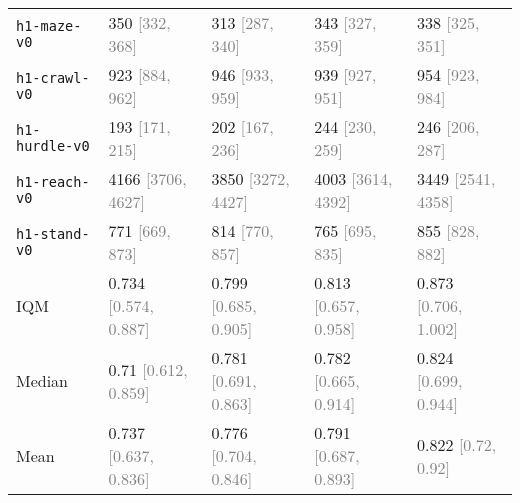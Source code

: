 \begin{table}[h]
{{\begin{tabular}{lllll}
\texttt{h1-maze-v0} & 350 \textcolor{gray}{[332, 368]} & 313 \textcolor{gray}{[287, 340]} & 343 \textcolor{gray}{[327, 359]} & 338 \textcolor{gray}{[325, 351]} \\
\texttt{h1-crawl-v0} & 923 \textcolor{gray}{[884, 962]} & 946 \textcolor{gray}{[933, 959]} & 939 \textcolor{gray}{[927, 951]} & 954 \textcolor{gray}{[923, 984]} \\
\texttt{h1-hurdle-v0} & 193 \textcolor{gray}{[171, 215]} & 202 \textcolor{gray}{[167, 236]} & 244 \textcolor{gray}{[230, 259]} & 246 \textcolor{gray}{[206, 287]} \\
\texttt{h1-reach-v0} & 4166 \textcolor{gray}{[3706, 4627]} & 3850 \textcolor{gray}{[3272, 4427]} & 4003 \textcolor{gray}{[3614, 4392]} & 3449 \textcolor{gray}{[2541, 4358]} \\
\texttt{h1-stand-v0} & 771 \textcolor{gray}{[669, 873]} & 814 \textcolor{gray}{[770, 857]} & 765 \textcolor{gray}{[695, 835]} & 855 \textcolor{gray}{[828, 882]} \\ \midrule
IQM & 0.734 \textcolor{gray}{[0.574, 0.887]} & 0.799 \textcolor{gray}{[0.685, 0.905]} & 0.813 \textcolor{gray}{[0.657, 0.958]} & 0.873 \textcolor{gray}{[0.706, 1.002]} \\
Median & 0.71 \textcolor{gray}{[0.612, 0.859]} & 0.781 \textcolor{gray}{[0.691, 0.863]} & 0.782 \textcolor{gray}{[0.665, 0.914]} & 0.824 \textcolor{gray}{[0.699, 0.944]} \\
Mean & 0.737 \textcolor{gray}{[0.637, 0.836]} & 0.776 \textcolor{gray}{[0.704, 0.846]} & 0.791 \textcolor{gray}{[0.687, 0.893]} & 0.822 \textcolor{gray}{[0.72, 0.92]} \\
\bottomrule
\end{tabular}
}
}
\vspace{-0.1in}
\end{table}


